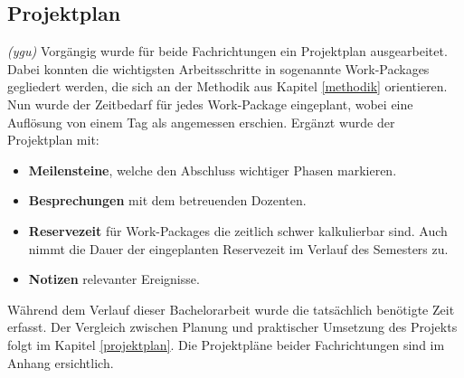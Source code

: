 \subsection{Projektplan}
\textit{(ygu)} Vorgängig wurde für beide Fachrichtungen ein Projektplan ausgearbeitet. Dabei konnten die wichtigsten Arbeitsschritte in sogenannte Work-Packages gegliedert werden, die sich an der Methodik aus Kapitel \ref{methodik} orientieren. Nun wurde der Zeitbedarf für jedes Work-Package eingeplant, wobei eine Auflösung von einem Tag als angemessen erschien. Ergänzt wurde der Projektplan mit:

\begin{itemize}
	\item \textbf{Meilensteine}, welche den Abschluss wichtiger Phasen markieren.
	
	\item \textbf{Besprechungen} mit dem betreuenden Dozenten.
	
	\item \textbf{Reservezeit} für Work-Packages die zeitlich schwer kalkulierbar sind. Auch nimmt die Dauer der eingeplanten Reservezeit im Verlauf des Semesters zu.
	
	\item \textbf{Notizen} relevanter Ereignisse.
\end{itemize}

Während dem Verlauf dieser Bachelorarbeit wurde die tatsächlich benötigte Zeit erfasst. Der Vergleich zwischen Planung und praktischer Umsetzung des Projekts folgt im Kapitel  \ref{projektplan}. Die Projektpläne beider Fachrichtungen sind im Anhang ersichtlich. 